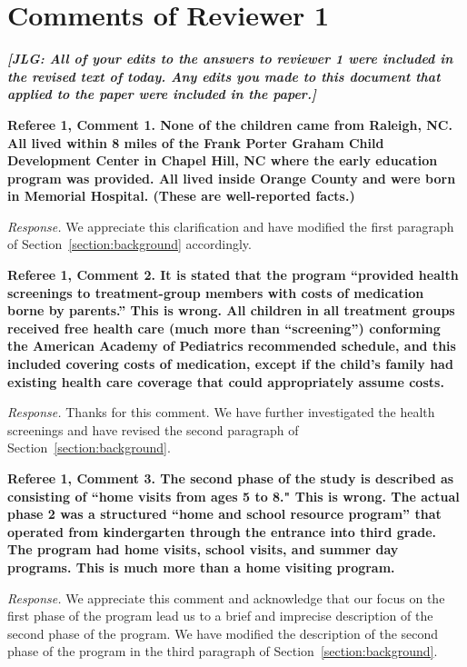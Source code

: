 \section*{Comments of Reviewer 1}

\noindent \textit{\textbf{[JLG: All of your edits to the answers to reviewer 1 were included in the revised text of today. Any edits you made to this document that applied to the paper were included in the paper.]}}

\noindent \textbf{Referee 1, Comment 1. None of the children came from Raleigh, NC. All lived within 8 miles of the Frank Porter Graham Child Development Center in Chapel Hill, NC where the early education program was provided. All lived inside Orange County and were born in Memorial Hospital. (These are well-reported facts.)}

\noindent \textit{Response.} We appreciate this clarification and have modified the first paragraph of Section~\ref{section:background} accordingly.

\noindent \textbf{Referee 1, Comment 2. It is stated that the program ``provided health screenings to treatment-group members with costs of medication borne by parents.'' This is wrong. All children in all treatment groups received free health care (much more than ``screening'') conforming the American Academy of Pediatrics recommended schedule, and this included covering costs of medication, except if the child's family had existing health care coverage that could appropriately assume costs.}

\noindent \textit{Response.} Thanks for this comment. We have further investigated the health screenings and have revised the second paragraph of Section~\ref{section:background}.

\noindent \textbf{Referee 1, Comment 3. The second phase of the study is described as consisting of ``home visits from ages 5 to 8." This is wrong. The actual phase 2 was a structured ``home and school resource program'' that operated from kindergarten through the entrance into third grade. The program had home visits, school visits, and summer day programs. This is much more than a home visiting program.}

\noindent \textit{Response.} We appreciate this comment and acknowledge that our focus on the first phase of the program lead us to a brief and imprecise description of the second phase of the program. We have modified the description of the second phase of the program in the third paragraph of Section~\ref{section:background}.

